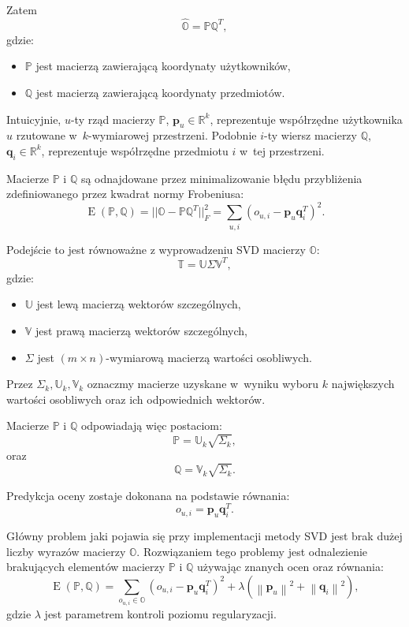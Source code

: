 \documentclass[12pt,a4paper]{report}
\newcommand{\setR}{\mathbb{R}}
\newcommand{\norm}[2][]{\left\| {#2} \right\|_{#1}}
\newcommand{\e}[1]{\operatorname{E}\left({#1} \right)}
\begin{document}
Zatem
$$
\widehat{\mathbb{O}} = \mathbb{P}\mathbb{Q}^T,
$$
gdzie:
\begin{itemize}
\item $\mathbb{P}$ jest macierzą zawierającą koordynaty użytkowników,
\item $\mathbb{Q}$ jest macierzą zawierającą koordynaty przedmiotów.
\end{itemize}

Intuicyjnie, $u$-ty rząd macierzy $\mathbb{P}$, $\mathbf{p}_u \in \setR^k$, reprezentuje współrzędne użytkownika $u$ rzutowane w~$k$-wymiarowej przestrzeni. Podobnie $i$-ty wiersz macierzy $\mathbb{Q}$, $\mathbf{q}_i \in \setR^k$, reprezentuje współrzędne przedmiotu $i$ w~tej przestrzeni.

Macierze $\mathbb{P}$ i $\mathbb{Q}$ są odnajdowane przez minimalizowanie błędu przybliżenia zdefiniowanego przez kwadrat normy Frobeniusa:
$$
\e{\mathbb{P}, \mathbb{Q}} = ||\mathbb{O}-\mathbb{P} \mathbb{Q}^T||_F^2 = \sum_{u,i}(o_{u,i} - \mathbf{p}_u\mathbf{q}_i^T)^2.
$$

Podejście to jest równoważne z wyprowadzeniu SVD macierzy $\mathbb{O}$:
$$
\mathbb{T} = \mathbb{U} \Sigma \mathbb{V}^T,
$$
gdzie:
\begin{itemize}
\item $\mathbb{U}$ jest lewą macierzą wektorów szczególnych,
\item $\mathbb{V}$ jest prawą macierzą wektorów szczególnych,
\item $\Sigma$ jest $(m\times n)$-wymiarową macierzą wartości osobliwych.
\end{itemize}

Przez $\Sigma_k, \mathbb{U}_k, \mathbb{V}_k$ oznaczmy macierze uzyskane w~wyniku wyboru $k$ największych wartości osobliwych oraz ich odpowiednich wektorów. 

Macierze $\mathbb{P}$ i $\mathbb{Q}$ odpowiadają więc postaciom:
$$
\mathbb{P}=\mathbb{U}_k \sqrt{\Sigma_k},
$$
oraz 
$$
\mathbb{Q}=\mathbb{V}_k \sqrt{\Sigma_k}.
$$

Predykcja oceny zostaje dokonana na podstawie równania:
$$
o_{u,i} = \mathbf{p}_u \mathbf{q}_i^T.
$$

Główny problem jaki pojawia się przy implementacji metody SVD jest brak dużej liczby wyrazów macierzy $\mathbb{O}$. 
Rozwiązaniem tego problemy jest odnalezienie brakujących elementów macierzy $\mathbb{P}$ i $\mathbb{Q}$ używając znanych ocen oraz równania:
$$
\e{\mathbb{P}, \mathbb{Q}} = \sum_{o_{u,i} \in \mathbb{O}}(o_{u,i} - \mathbf{p}_u\mathbf{q}_i^T)^2 + \lambda(\norm{\mathbf{p}_u}^2 + \norm{\mathbf{q}_i}^2),
$$
gdzie $\lambda$ jest parametrem kontroli poziomu regularyzacji.
\end{document}
